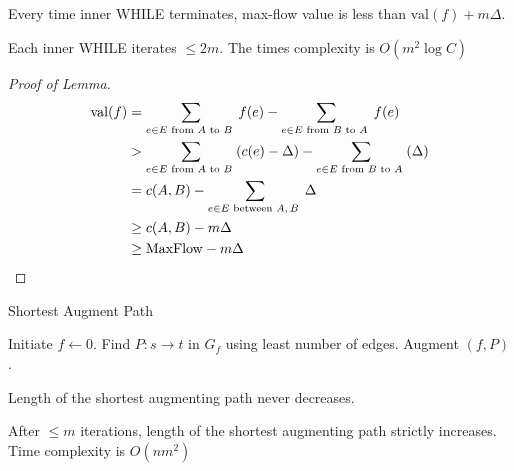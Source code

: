 
\begin{lemma}
    Every time inner WHILE terminates, max-flow value is less than  $ \mathrm{val}(f)+m\Delta $. 
\end{lemma}

\begin{corollary}
    Each inner WHILE iterates  $  \leq 2m $. The times complexity is  $ O(m^2\log C) $  
\end{corollary}
\begin{proof}[Proof of Lemma]
    \begin{align*}
        \mathrm{val}(f)&=\sum_{e\in E\text{ from $ A $ to  $ B $ }}f(e)-\sum_{e\in E\text{ from  $ B $ to  $ A $ }}f(e)\\
        &>\sum_{e\in E\text{ from $ A $ to  $ B $ }}(c(e)-\Delta)-\sum_{e\in E\text{ from  $ B $ to  $ A $ }}(\Delta)\\
        &=c(A,B)-\sum_{e\in E\text{ between  $ A,B $ }}\Delta\\
        & \geq c(A,B)-m\Delta\\
        & \geq \mathrm{MaxFlow}-m\Delta
    \end{align*}
\end{proof}


\begin{algorithm}
    \caption{Shortest Augment Path}
    \begin{algorithmic}
        \STATE Initiate $ f\leftarrow 0 $.
            \STATE Find  $ P:s\rightarrow t $ in  $ G_f $ using least number of edges.
            \STATE Augment  $ (f,P) $.   
        \ENDWHILE 
    \end{algorithmic}
\end{algorithm}
\begin{lemma}
    Length of the shortest augmenting path never decreases.
\end{lemma}
\begin{lemma}\label{shortest augment path lemma -strongest version}
    After  $   \leq  m$ iterations, length of the shortest augmenting path strictly increases. Time complexity is  $ O(nm^2) $ 
\end{lemma}

